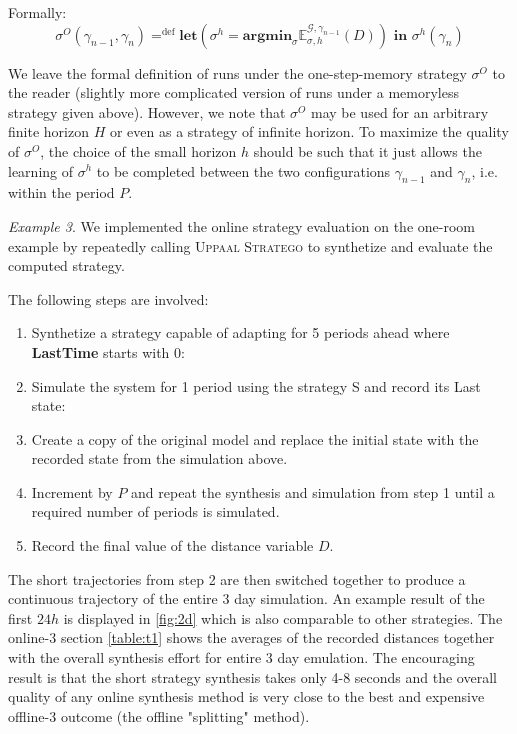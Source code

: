     Formally:
    \begin{equation*}
        \sigma^O (\gamma_{n-1},\gamma_{n}) =^{\text{def}} \textbf{let}(\sigma^h = \textbf{argmin}_{\sigma}\mathbb{E}^{\mathcal{G},\gamma_{n-1}}_{\sigma,h}(D) ) \textbf{ in } \sigma^h(\gamma_n) 
    \end{equation*}

    We leave the formal definition of runs under the one-step-memory strategy $\sigma^O$
    to the reader (slightly more complicated version of runs under a memoryless strategy given above).
    However, we note that $\sigma^O$ may be used for an arbitrary finite horizon $H$ or 
    even as a strategy of infinite horizon. To maximize the quality of $\sigma^O$, the choice
    of the small horizon $h$ should be such that it just allows the learning of $\sigma^h$
    to be completed between the two configurations $\gamma_{n-1}$ and $\gamma_n$, i.e.
    within the period $P$.  

    \emph{Example 3}. We implemented the online strategy evaluation on the one-room 
    example by repeatedly calling \textsc{Uppaal Stratego} to synthetize 
    and evaluate the computed strategy. \cite{larsen2016online} 

    The following steps are involved:
    
    \begin{enumerate}
      \item Synthetize a strategy capable of adapting for 5 periods ahead where 
      \textbf{LastTime} starts with 0: \textbf{ }
      \item Simulate the system for 1 period using the strategy S and record its Last
      state: \textbf{ }
      \item Create a copy of the original model and replace the initial state with the 
      recorded state from the simulation above.
      \item Increment \textbf{} by $P$ and repeat the synthesis and 
      simulation from step 1 until a required number of periods is simulated.
      \item Record the final value of the distance variable $D$.
    \end{enumerate}    

    The short trajectories from step 2 are then switched together to produce 
    a continuous trajectory of the entire 3 day simulation. An example result of 
    the first $24h$ is displayed in \autoref{fig:2d} which is also comparable 
    to other strategies. The online-3 section \autoref{table:t1} shows the averages
    of the recorded distances together with the overall synthesis effort for 
    entire 3 day emulation. The encouraging result is that the short strategy 
    synthesis takes only 4-8 seconds and the overall quality of any online 
    synthesis method is very close to the best and expensive offline-3 outcome 
    (the offline "splitting" method).


